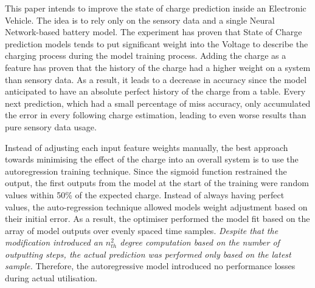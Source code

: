 This paper intends to improve the state of charge prediction inside an Electronic Vehicle.
The idea is to rely only on the sensory data and a single Neural Network-based battery model.
The experiment has proven that State of Charge prediction models tends to put significant weight into the Voltage to describe the charging process during the model training process.
Adding the charge as a feature has proven that the history of the charge had a higher weight on a system than sensory data.
As a result, it leads to a decrease in accuracy since the model anticipated to have an absolute perfect history of the charge from a table.
Every next prediction, which had a small percentage of miss accuracy, only accumulated the error in every following charge estimation, leading to even worse results than pure sensory data usage.

%
%
Instead of adjusting each input feature weights manually, the best approach towards minimising the effect of the charge into an overall system is to use the autoregression training technique.
Since the sigmoid function restrained the output, the first outputs from the model at the start of the training were random values within 50\% of the expected charge.
Instead of always having perfect values, the auto-regression technique allowed models weight adjustment based on their initial error.
As a result, the optimiser performed the model fit based on the array of model outputs over evenly spaced time samples.
\textit{Despite that the modification introduced an $n_{th}^{2}$ degree computation based on the number of outputting steps, the actual prediction was performed only based on the latest sample.}
Therefore, the autoregressive model introduced no performance losses during actual utilisation. 

    


